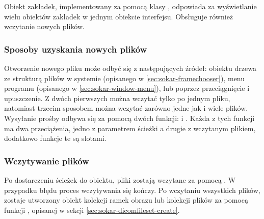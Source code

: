 \label{sec:sokar-dicomtabs}

\par
Obiekt zakładek, implementowany za pomocą klasy , odpowiada za wyświetlanie wielu obiektów zakładek w jednym obiekcie interfejsu.
Obsługuje również wczytanie nowych plików.

\subsubsection{Sposoby uzyskania nowych plików}

\par
Otworzenie nowego pliku może odbyć się z następujących źródeł: obiektu drzewa ze strukturą plików w systemie (opisanego w \ref{sec:sokar-framechooser}), menu programu (opisanego w \ref{sec:sokar-window-menu}), lub poprzez przeciągnięcie i upuszczenie.
Z dwóch pierwszych można wczytać tylko po jednym pliku, natomiast trzecim sposobem można wczytać zarówno jedne jak i wiele plików.
Wysyłanie prośby odbywa się za pomocą dwóch funkcji:  i .
Każda z tych funkcji ma dwa przeciążenia, jedno z parametrem ścieżki a drugie z wczytanym plikiem, dodatkowo funkcje te są slotami.

\subsubsection{Wczytywanie plików}

\par
Po dostarczeniu ścieżek do obiektu, pliki zostają wczytane za pomocą .
W przypadku błędu proces wczytywania się kończy.
Po wczytaniu wszystkich plików, zostaje utworzony obiekt kolekcji ramek obrazu lub kolekcji plików \DICOM za pomocą funkcji , opisanej w sekcji \ref{sec:sokar-dicomfileset-create}.
